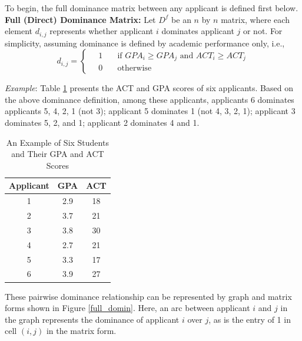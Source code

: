 \documentclass[12pt,english]{report}
\begin{document}
To begin, the full dominance matrix between any applicant is defined first below. 
\textbf{Full (Direct) Dominance Matrix:} Let $D^{f}$ be an $n$ by $n$ matrix, where each element $d_{i,j}$ represents whether applicant $i$ dominates applicant $j$ or not. For simplicity, assuming dominance is defined by academic performance only, i.e., 
\begin{equation}
   d_{i,j} =
  \begin{cases}
  \quad   1   & \quad \mbox{if }  GPA_i \geq GPA_j \mbox{ and }  ACT_i \geq ACT_j \\
  \quad   0  & \quad \mbox{otherwise}
  \end{cases}	
\end{equation}

\noindent \textit{Example}:  Table \ref{student_sample} presents the ACT and GPA scores of six applicants.  Based on the above dominance definition, among these applicants,  applicants 6 dominates applicants 5, 4, 2, 1 (not 3); applicant 5 dominates 1 (not 4, 3, 2, 1); applicant 3 dominates 5, 2, and 1; applicant 2 dominates 4 and 1. 
\begin{table}[ht!]
\centering
\begin{tabular}{|c|c|c|}
\hline
  Applicant & GPA & ACT \\ [0.5ex] 
\hline
1 & 2.9 & 18 \\ \hline
2 & 3.7 & 21 \\ \hline
3 & 3.8 & 30 \\ \hline
4 & 2.7 & 21 \\ \hline
5 & 3.3 & 17 \\ \hline
6 & 3.9 & 27 \\ \hline
\end{tabular}
\caption{An Example of Six Students and Their GPA and ACT Scores} 
\label{student_sample}
\end{table}

These pairwise dominance relationship can be represented by graph and matrix forms shown in Figure \ref{full_domin}. Here, an arc between applicant $i$ and $j$ in the graph represents the dominance of applicant $i$ over $j$,  as is the entry of 1 in cell $(i,j)$ in the matrix form. 
\end{document}
